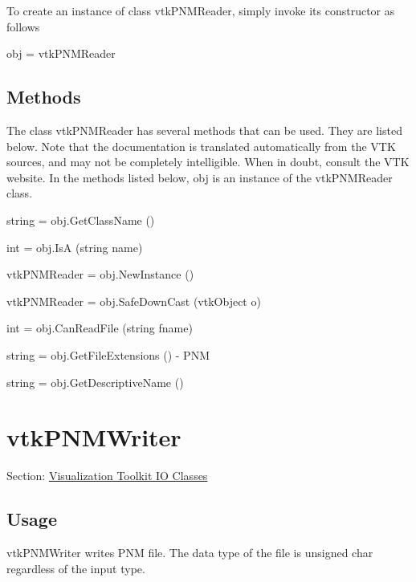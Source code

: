 To create an instance of class vtk\-P\-N\-M\-Reader, simply invoke its constructor as follows \begin{DoxyVerb}  obj = vtkPNMReader
\end{DoxyVerb}
 \hypertarget{vtkwidgets_vtkxyplotwidget_Methods}{}\subsection{Methods}\label{vtkwidgets_vtkxyplotwidget_Methods}
The class vtk\-P\-N\-M\-Reader has several methods that can be used. They are listed below. Note that the documentation is translated automatically from the V\-T\-K sources, and may not be completely intelligible. When in doubt, consult the V\-T\-K website. In the methods listed below, {\ttfamily obj} is an instance of the vtk\-P\-N\-M\-Reader class. 
\begin{DoxyItemize}
\item {\ttfamily string = obj.\-Get\-Class\-Name ()}  
\item {\ttfamily int = obj.\-Is\-A (string name)}  
\item {\ttfamily vtk\-P\-N\-M\-Reader = obj.\-New\-Instance ()}  
\item {\ttfamily vtk\-P\-N\-M\-Reader = obj.\-Safe\-Down\-Cast (vtk\-Object o)}  
\item {\ttfamily int = obj.\-Can\-Read\-File (string fname)}  
\item {\ttfamily string = obj.\-Get\-File\-Extensions ()} -\/ P\-N\-M  
\item {\ttfamily string = obj.\-Get\-Descriptive\-Name ()}  
\end{DoxyItemize}\hypertarget{vtkio_vtkpnmwriter}{}\section{vtk\-P\-N\-M\-Writer}\label{vtkio_vtkpnmwriter}
Section\-: \hyperlink{sec_vtkio}{Visualization Toolkit I\-O Classes} \hypertarget{vtkwidgets_vtkxyplotwidget_Usage}{}\subsection{Usage}\label{vtkwidgets_vtkxyplotwidget_Usage}
vtk\-P\-N\-M\-Writer writes P\-N\-M file. The data type of the file is unsigned char regardless of the input type.

